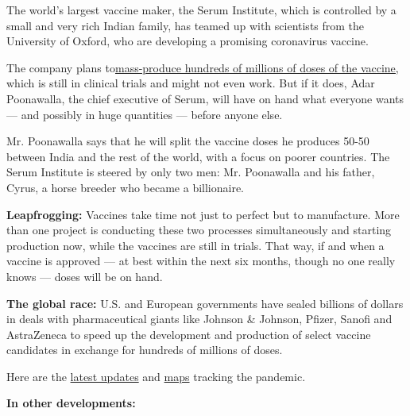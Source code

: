 The world's largest vaccine maker, the Serum Institute, which is
controlled by a small and very rich Indian family, has teamed up with
scientists from the University of Oxford, who are developing a promising
coronavirus vaccine.

The company plans
to\href{https://www.nytimes3xbfgragh.onion/2020/08/01/world/asia/coronavirus-vaccine-india.html}{mass-produce
hundreds of millions of doses of the vaccine,} which is still in
clinical trials and might not even work. But if it does, Adar
Poonawalla, the chief executive of Serum, will have on hand what
everyone wants --- and possibly in huge quantities --- before anyone
else.

Mr. Poonawalla says that he will split the vaccine doses he produces
50-50 between India and the rest of the world, with a focus on poorer
countries. The Serum Institute is steered by only two men: Mr.
Poonawalla and his father, Cyrus, a horse breeder who became a
billionaire.

\textbf{Leapfrogging:} Vaccines take time not just to perfect but to
manufacture. More than one project is conducting these two processes
simultaneously and starting production now, while the vaccines are still
in trials. That way, if and when a vaccine is approved --- at best
within the next six months, though no one really knows --- doses will be
on hand.

\textbf{The global race:} U.S. and European governments have sealed
billions of dollars in deals with pharmaceutical giants like Johnson \&
Johnson, Pfizer, Sanofi and AstraZeneca to speed up the development and
production of select vaccine candidates in exchange for hundreds of
millions of doses.

Here are the
\href{https://www.nytimes3xbfgragh.onion/2020/08/02/world/coronavirus-covid-19.html}{latest
updates} and
\href{https://www.nytimes3xbfgragh.onion/interactive/2020/world/coronavirus-maps.html}{maps}
tracking the pandemic.

\textbf{In other developments:}

